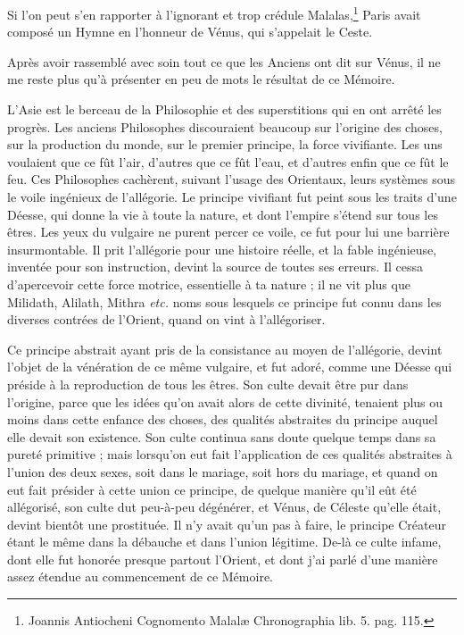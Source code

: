 \documentclass[a4paper, 11pt, oneside, polutonikogreek, french]{article}
\begin{document}
Si l'on peut s'en rapporter à l'ignorant et trop crédule Malalas,\footnote{Joannis Antiocheni Cognomento Malalæ Chronographia lib. 5. pag. 115.} Paris avait composé un Hymne en l'honneur de Vénus, qui s'appelait le Ceste.

Après avoir rassemblé avec soin tout ce que les Anciens ont dit sur Vénus, il ne me reste plus qu'à présenter en peu de mots le résultat de ce Mémoire.

L'Asie est le berceau de la Philosophie et des superstitions qui en ont arrêté les progrès. Les anciens Philosophes discouraient beaucoup sur l'origine des choses, sur la production du monde, sur le premier principe, la force vivifiante. Les uns voulaient que ce fût l'air, d'autres que ce fût l'eau, et d'autres enfin que ce fût le feu. Ces Philosophes cachèrent, suivant l'usage des Orientaux, leurs systèmes sous le voile ingénieux de l'allégorie. Le principe vivifiant fut peint sous les traits d'une Déesse, qui donne la vie à toute la nature, et dont l'empire s'étend sur tous les êtres. Les yeux du vulgaire ne purent percer ce voile, ce fut pour lui une barrière insurmontable. Il prit l'allégorie pour une histoire réelle, et la fable ingénieuse, inventée pour son instruction, devint la source de toutes ses erreurs. Il cessa d'apercevoir cette force motrice, essentielle à ta nature ; il ne vit plus que Milidath, Alilath, Mithra \emph{etc.} noms sous lesquels ce principe fut connu dans les diverses contrées de l'Orient, quand on vint à l'allégoriser.

Ce principe abstrait ayant pris de la consistance au moyen de l'allégorie, devint l'objet de la vénération de ce même vulgaire, et fut adoré, comme une Déesse qui préside à la reproduction de tous les êtres. Son culte devait être pur dans l'origine, parce que les idées qu'on avait alors de cette divinité, tenaient plus ou moins dans cette enfance des choses, des qualités abstraites du principe auquel elle devait son existence. Son culte continua sans doute quelque temps dans sa pureté primitive ; mais lorsqu'on eut fait l'application de ces qualités abstraites à l'union des deux sexes, soit dans le mariage, soit hors du mariage, et quand on eut fait présider à cette union ce principe, de quelque manière qu'il eût été allégorisé, son culte dut peu-à-peu dégénérer, et Vénus, de Céleste qu'elle était, devint bientôt une prostituée. Il n'y avait qu'un pas à faire, le principe Créateur étant le même dans la débauche et dans l'union légitime. De-là ce culte infame, dont elle fut honorée presque partout l'Orient, et dont j'ai parlé d'une manière assez étendue au commencement de ce Mémoire.
\end{document}
